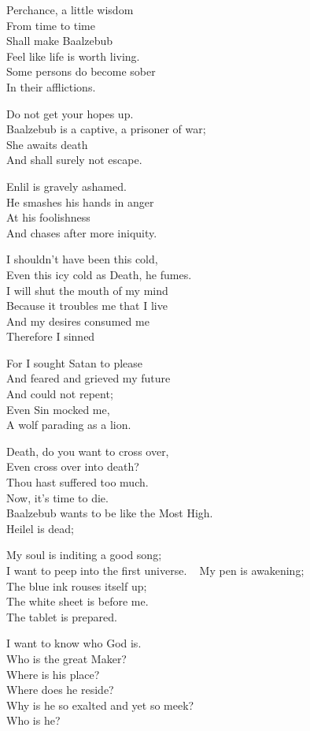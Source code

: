 \documentclass[
]{book}
\begin{document}
Perchance, a little wisdom\\
From time to time\\
Shall make Baalzebub\\
Feel like life is worth living.\\
Some persons do become sober\\
In their afflictions.

Do not get your hopes up.\\
Baalzebub is a captive, a prisoner of war;\\
She awaits death\\
And shall surely not escape.

Enlil is gravely ashamed.\\
He smashes his hands in anger\\
At his foolishness\\
And chases after more iniquity.

I shouldn't have been this cold,\\
Even this icy cold as Death, he fumes.\\
I will shut the mouth of my mind\\
Because it troubles me that I live\\
And my desires consumed me\\
Therefore I sinned

For I sought Satan to please\\
And feared and grieved my future\\
And could not repent;\\
Even Sin mocked me,\\
A wolf parading as a lion.

Death, do you want to cross over,\\
Even cross over into death?\\
Thou hast suffered too much.\\
Now, it's time to die.\\
Baalzebub wants to be like the Most High.\\
Heilel is dead;

My soul is inditing a good song;\\
I want to peep into the first universe. ~
My pen is awakening;\\
The blue ink rouses itself up;\\
The white sheet is before me.\\
The tablet is prepared.

I want to know who God is.\\
Who is the great Maker?\\
Where is his place?\\
Where does he reside?\\
Why is he so exalted and yet so meek?\\
Who is he?
\end{document}
